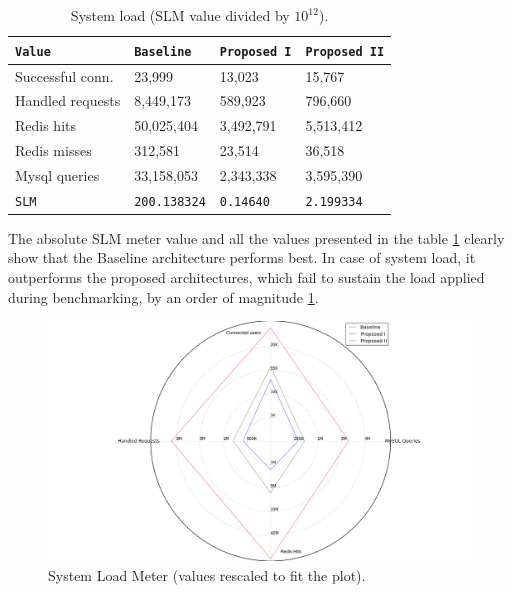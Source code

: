 \documentclass{uvamscse}
\begin{document}
\begin{table}[H]
\begin{center}
\begin{tabular}{llll}
  \texttt{Value}                & \texttt{Baseline}   & \texttt{Proposed I}  & \texttt{Proposed II} \\
  \hline
  Successful conn.              & 23,999              & 13,023               & 15,767              \\
  Handled requests              & 8,449,173           & 589,923              & 796,660              \\
  Redis hits                    & 50,025,404          & 3,492,791            & 5,513,412              \\
  Redis misses                  & 312,581             & 23,514               & 36,518              \\
  Mysql queries                 & 33,158,053          & 2,343,338            & 3,595,390              \\
  \hline
  \texttt{SLM}                  & \texttt{200.138324} & \texttt{0.14640}     & \texttt{2.199334}         \\
\end{tabular}
\end{center}
\caption{System load (SLM value divided by $10^{12}$).}
\label{table:slm}
\end{table}

The absolute SLM meter value and all the values presented in the table \ref{table:slm} clearly show that the Baseline architecture performs best. In case of system load, it outperforms the proposed architectures, which fail to sustain the load applied during benchmarking, by an order of magnitude \ref{figure:slm}.

\begin{figure}[H]
\centering
\includegraphics[scale=0.3]{slm}
\caption{System Load Meter (values rescaled to fit the plot).}
\label{figure:slm}
\end{figure}
\end{document}
